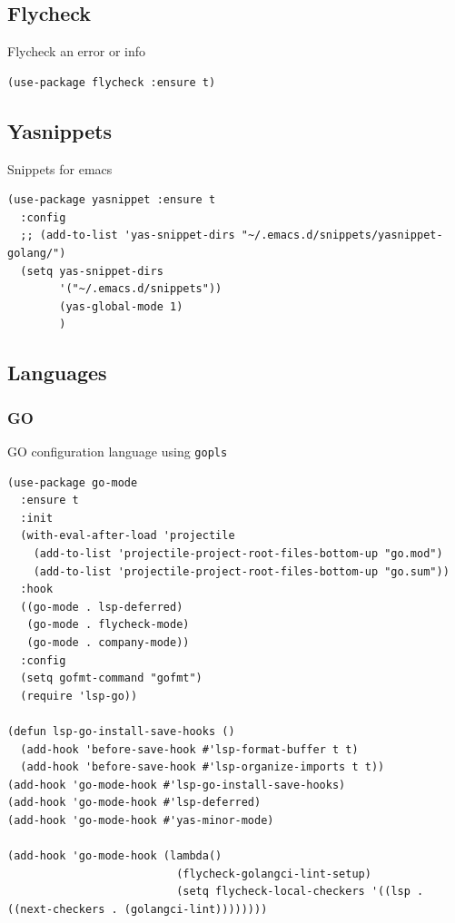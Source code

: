 \documentclass[11pt]{article}
\begin{document}
\subsection{Flycheck}
\label{sec:orge2ee72c}

Flycheck an error or info

\begin{verbatim}
(use-package flycheck :ensure t)
\end{verbatim}

\subsection{Yasnippets}
\label{sec:orga860bd9}

Snippets for emacs

\begin{verbatim}
(use-package yasnippet :ensure t
  :config
  ;; (add-to-list 'yas-snippet-dirs "~/.emacs.d/snippets/yasnippet-golang/")
  (setq yas-snippet-dirs
        '("~/.emacs.d/snippets"))
        (yas-global-mode 1)
        )
\end{verbatim}

\subsection{Languages}
\label{sec:orgd9e2cc5}
\subsubsection{GO}
\label{sec:orgdb6e872}

GO configuration language using \texttt{gopls}

\begin{verbatim}
(use-package go-mode
  :ensure t
  :init
  (with-eval-after-load 'projectile
    (add-to-list 'projectile-project-root-files-bottom-up "go.mod")
    (add-to-list 'projectile-project-root-files-bottom-up "go.sum"))
  :hook
  ((go-mode . lsp-deferred)
   (go-mode . flycheck-mode)
   (go-mode . company-mode))
  :config
  (setq gofmt-command "gofmt")
  (require 'lsp-go))

(defun lsp-go-install-save-hooks ()
  (add-hook 'before-save-hook #'lsp-format-buffer t t)
  (add-hook 'before-save-hook #'lsp-organize-imports t t))
(add-hook 'go-mode-hook #'lsp-go-install-save-hooks)
(add-hook 'go-mode-hook #'lsp-deferred)
(add-hook 'go-mode-hook #'yas-minor-mode)

(add-hook 'go-mode-hook (lambda()
                          (flycheck-golangci-lint-setup)
                          (setq flycheck-local-checkers '((lsp . ((next-checkers . (golangci-lint))))))))


\end{verbatim}
\end{document}
